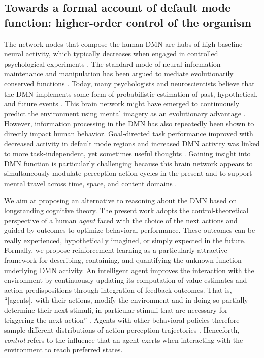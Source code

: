 \documentclass[10pt,letterpaper]{article}
\begin{document}
\subsection{Towards a formal account of default mode function: higher-order control of the organism}
The network nodes that compose the human DMN
are hubs of high baseline neural activity,
which typically decreases when engaged in controlled psychological experiments
\citep{raichle_baseline}.
The standard mode of
neural information maintenance and manipulation has
been argued to mediate evolutionarily conserved functions
\citep{brown1914nature, binder1999conceptual, buzsaki2006rhythms}.
Today, many psychologists and neuroscientists believe that
the DMN implements some form of
probabilistic estimation of past, hypothetical, and
future events
\citep{fox2005, hassabis2007patients, schacter2007remembering, binder2009,
randy2008, spreng2009common}.
This brain network
might have emerged to continuously predict the environment using
mental imagery as an evolutionary advantage \citep{suddendorf2007evolution}.
%
However, information processing in the DMN has also repeatedly
been shown to directly impact human behavior. Goal-directed task performance
improved with decreased activity in default mode regions \citep{weiss2006}
and increased DMN activity was linked to more task-independent,
yet sometimes useful thoughts
\citep{mason2007, seli2016mind}.
%
Gaining insight into DMN function is
particularly challenging because
this brain network appears to
simultaneously modulate perception-action cycles in the present
and to support mental travel
across time, space, and content domains
\citep{boyer2008evolutionary}.



We aim at proposing an alternative to reasoning about the DMN
based on longstanding cognitive theory.
The present work adopts the control-theoretical perspective of
a human \textit{agent} faced with the choice of the next actions
and guided by outcomes to optimize behavioral performance. These outcomes
can be really experienced, hypothetically imagined, or simply expected in the future.
Formally, we propose reinforcement learning as a particularly attractive framework
for describing, containing, and quantifying the unknown function underlying DMN activity.
An intelligent agent improves the interaction with the environment
by continuously updating its computation of value estimates and action predispositions
through integration of feedback outcomes.
That is, ``[agents], with their actions, modify the environment and in doing so
partially determine their next stimuli, in particular stimuli that are necessary
for triggering the next action''
\citep{pezzulo2011grounding}.
Agents with other behavioral policies therefore sample different
distributions of action-perception trajectories \citep{ghavamzadeh2015bayesian}.
Henceforth,
\textit{control} refers to the influence that an agent exerts when interacting
with the environment to reach preferred states.
\end{document}
